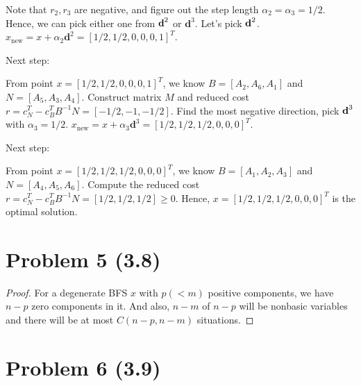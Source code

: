 \documentclass[12pt]{article}
\begin{document}
Note that $r_2, r_3$ are negative, and figure out the step length $\alpha_2 = \alpha_3 = 1/2$. Hence, we can pick either one from $\textbf d^2$ or $\textbf{d}^3$. Let's pick $\textbf d^2$. $x_{\text{new}} = x + \alpha_2\textbf{d}^2 = [1/2,1/2,0,0,0,1]^T$. 

Next step:

From point $x =  [1/2,1/2,0,0,0,1]^T$, we know $B = [A_2, A_6, A_1]$ and $N = [A_5, A_3, A_4]$. Construct matrix $M$ and reduced cost $r = c_N^T - c_B^TB^{-1}N = [-1/2, -1, -1/2]$. Find the most negative direction, pick $\textbf d^3$ with $\alpha_3 = 1/2$. $x_{\text{new}} = x + \alpha_3\textbf{d}^3 =  [1/2, 1/2, 1/2, 0, 0, 0]^T$.

Next step:

From point $x = [1/2, 1/2, 1/2, 0, 0, 0]^T$, we know $B = [A_1, A_2, A_3]$ and $N = [A_4, A_5, A_6]$. Compute the reduced cost $r = c_N^T - c_B^TB^{-1}N = [1/2, 1/2, 1/2]  \geqslant 0$. Hence, $x = [1/2, 1/2, 1/2, 0, 0, 0]^T$ is the optimal solution.



\section*{Problem 5 (3.8)}

\begin{proof}

For a degenerate BFS $x$ with $p(<m)$ positive components, we have $n-p$ zero components in it. And also, $n-m$ of $n-p$ will be nonbasic variables and there will be at most $C(n-p, n-m)$ situations. 

\end{proof}


\section*{Problem 6 (3.9)}
\end{document}
